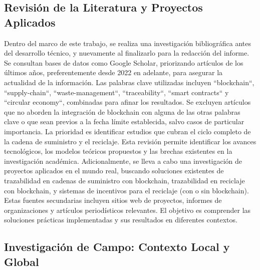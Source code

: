 \subsection{Revisión de la Literatura y Proyectos Aplicados}

Dentro del marco de este trabajo, se realiza una investigación bibliográfica antes del desarrollo técnico, y nuevamente al finalizarlo para la redacción del informe.
Se consultan bases de datos como Google Scholar, priorizando artículos de los últimos años, preferentemente desde 2022 en adelante, para asegurar la actualidad de la información.
Las palabras clave utilizadas incluyen ``blockchain``, ``supply-chain``, ``waste-management``, ``traceability``, ``smart contracts`` y ``circular economy``, combinadas para afinar los resultados.
Se excluyen artículos que no aborden la integración de blockchain con alguna de las otras palabras clave o que sean previos a la fecha límite establecida, salvo casos de particular importancia.
La prioridad es identificar estudios que cubran el ciclo completo de la cadena de suministro y el reciclaje.
Esta revisión permite identificar los avances tecnológicos, los modelos teóricos propuestos y las brechas existentes en la investigación académica.
Adicionalmente, se lleva a cabo una investigación de proyectos aplicados en el mundo real, buscando soluciones existentes de trazabilidad en cadenas de suministro con blockchain, trazabilidad en reciclaje con blockchain, y sistemas de incentivos para el reciclaje (con o sin blockchain).
Estas fuentes secundarias incluyen sitios web de proyectos, informes de organizaciones y artículos periodísticos relevantes.
El objetivo es comprender las soluciones prácticas implementadas y sus resultados en diferentes contextos.

\subsection{Investigación de Campo: Contexto Local y Global}

